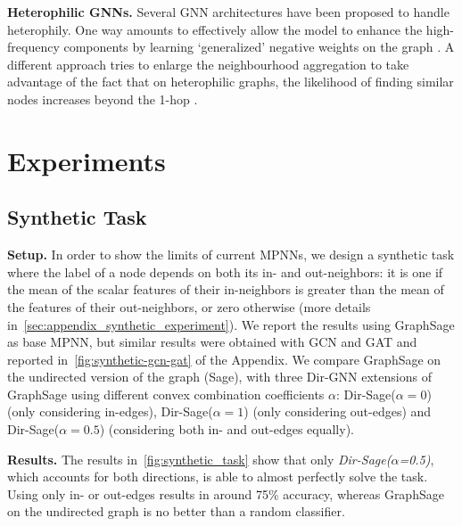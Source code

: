 \documentclass{article}
\newcommand\oursacro{Dir-GNN}
\theoremstyle{plain}
\theoremstyle{definition}
\theoremstyle{remark}
\begin{document}
\textbf{Heterophilic GNNs.}
Several GNN architectures have been proposed to handle heterophily. One way amounts to effectively allow the model to enhance the high-frequency components by learning `generalized' negative weights on the graph \cite{chien2020adaptive,bo2021beyond,luan2022revisiting,bodnar2022neural,di2022graph}.  
A different approach tries to enlarge the neighbourhood aggregation to take advantage of the fact that on heterophilic graphs, the likelihood of finding similar nodes increases beyond the 1-hop \cite{abu-el-haijaMixHopHigherOrderGraph2019,zhu2020beyond,lim2021large,maurya2021improving,li2022finding}.
 \section{Experiments} \label{sec:experiments}

\subsection{Synthetic Task} \label{sec:synthetic_experiments}

\textbf{Setup.} In order to show the limits of current MPNNs, we design a synthetic task where the label of a node depends on both its in- and out-neighbors: it is one if the mean of the scalar features of their in-neighbors is greater than the mean of the features of their out-neighbors, or zero otherwise (more details in~\cref{sec:appendix_synthetic_experiment}). We report the results using GraphSage as base MPNN, but similar results were obtained with GCN and GAT and reported in~\cref{fig:synthetic-gcn-gat} of the Appendix. We compare GraphSage on the undirected version of the graph (Sage), with three \oursacro{} extensions of GraphSage using different convex combination coefficients $\alpha$: Dir-Sage($\alpha=0$) (only considering in-edges), Dir-Sage($\alpha=1$) (only considering out-edges) and Dir-Sage($\alpha=0.5$) (considering both in- and out-edges equally).

\textbf{Results.} The results in~\cref{fig:synthetic_task} show that only \textit{Dir-Sage($\alpha$=0.5)}, which accounts for both directions, is able to almost perfectly solve the task. Using only in- or out-edges results in around 75\% accuracy, whereas GraphSage on the undirected graph is no better than a random classifier. 
\end{document}

